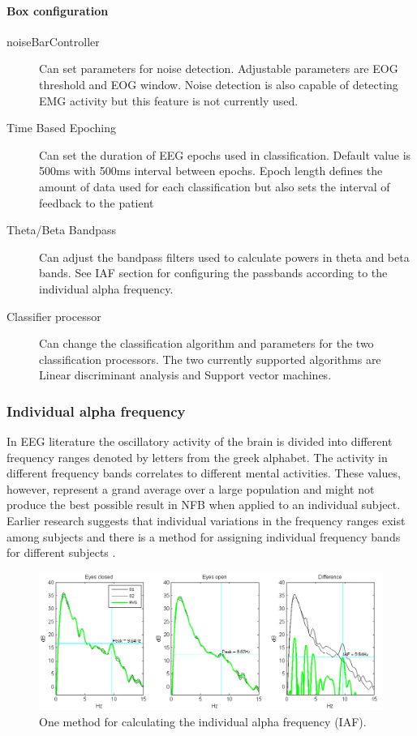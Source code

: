 \paragraph{Box configuration}

\begin{description}
\item[noiseBarController] Can set parameters for noise detection. Adjustable parameters are EOG threshold and EOG window. Noise detection is also capable of detecting EMG activity but this feature is not currently used.
\item[Time Based Epoching] Can set the duration of EEG  epochs used in classification. Default value is 500ms with 500ms interval between epochs. Epoch length defines the amount of data used for each classification but also sets the interval of feedback to the patient
\item[Theta/Beta Bandpass] Can adjust the bandpass filters used to calculate powers in theta and beta bands. See IAF section for configuring the passbands according to the individual alpha frequency.
\item[Classifier processor] Can change the classification algorithm and parameters for the two classification processors. The two currently supported algorithms are Linear discriminant analysis and Support vector machines. 
\end{description}

\subsubsection{Individual alpha frequency}
In EEG literature the oscillatory activity of the brain is divided into different frequency ranges denoted by letters from the greek alphabet. The activity in different frequency bands correlates to different mental activities. These values, however, represent a grand average over a large population and might not produce the best possible result in NFB when applied to an individual subject. Earlier research suggests that individual variations in the frequency ranges exist among subjects and there is a method for assigning individual frequency bands for different subjects \cite{klimesch1999eeg}. 

\begin{figure}[ht]
	\centering
	\includegraphics[scale=0.4]{IAF.png}
	\caption{One method for calculating the individual alpha frequency (IAF).}
\end{figure}

